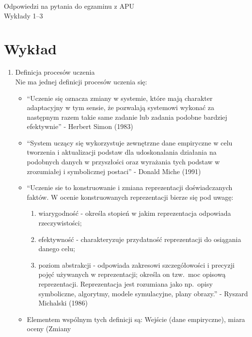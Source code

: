 \documentclass[11pt]{article}
\begin{document}
    \begin{center}
        \LARGE{Odpowiedzi na pytania do egzaminu z APU} \\
        \Large{Wykłady 1--3}
    \end{center}

    \vspace{2cm}
    
    \section{Wykład}
    \begin{enumerate}
        \item Definicja procesów uczenia \\
        Nie ma jednej definicji procesów uczenia się:
        \begin{itemize}
            \item ``Uczenie się oznacza zmiany w systemie, które mają charakter adaptacyjny
            w tym sensie, że pozwalają systemowi wykonać za następnym razem takie
            same zadanie lub zadania podobne bardziej efektywnie'' - Herbert Simon
            (1983)
            \item ``System uczący się wykorzystuje zewnętrzne dane empiryczne w celu tworzenia
            i aktualizacji podstaw dla udoskonalania działania na podobnych danych w przyszłości
            oraz wyrażania tych podstaw w zrozumiałej i symbolicznej postaci'' - Donald Miche
            (1991)
            \item ``Uczenie sie to konstruowanie i zmiana reprezentacji doświadczanych
            faktów.
            W ocenie konstruowanych reprezentacji bierze się pod uwagę:
            \begin{enumerate}
                \item wiarygodność - określa stopień w jakim reprezentacja odpowiada rzeczywistości;
                \item efektywność - charakteryzuje przydatność reprezentacji do osiągania danego celu;
                \item poziom abstrakcji - odpowiada zakresowi szczegółowości i precyzji pojęć używanych
                w reprezentacji; określa on tzw.\ moc opisową reprezentacji.
                Reprezentacja jest rozumiana jako np.\ opisy symboliczne, algorytmy,
                modele symulacyjne, plany obrazy.'' - Ryszard Michalski (1986)
            \end{enumerate}
            \item Elementem wspólnym tych definicji są: Wejście (dane empiryczne), miara oceny (Zmiany 

\end{itemize}
\end{enumerate}
\end{document}
